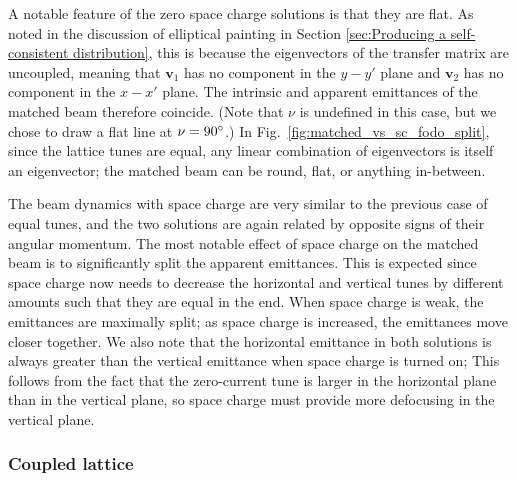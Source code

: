%
A notable feature of the zero space charge solutions is that they are flat. As noted in the discussion of elliptical painting in Section \ref{sec:Producing a self-consistent distribution}, this is because the eigenvectors of the transfer matrix are uncoupled, meaning that $\mathbf{v}_1$ has no component in the $y-y'$ plane and $\mathbf{v}_2$ has no component in the $x-x'$ plane. The intrinsic and apparent emittances of the matched beam therefore coincide. (Note that $\nu$ is undefined in this case, but we chose to draw a flat line at $\nu = 90\degree$.) In Fig.~\ref{fig:matched_vs_sc_fodo_split}, since the lattice tunes are equal, any linear combination of eigenvectors is itself an eigenvector; the matched beam can be round, flat, or anything in-between. 

The beam dynamics with space charge are very similar to the previous case of equal tunes, and the two solutions are again related by opposite signs of their angular momentum. The most notable effect of space charge on the matched beam is to significantly split the apparent emittances. This is expected since space charge now needs to decrease the horizontal and vertical tunes by different amounts such that they are equal in the end. When space charge is weak, the emittances are maximally split; as space charge is increased, the emittances move closer together. We also note that the horizontal emittance in both solutions is always greater than the vertical emittance when space charge is turned on; This follows from the fact that the zero-current tune is larger in the horizontal plane than in the vertical plane, so space charge must provide more defocusing in the vertical plane.






\subsubsection{Coupled lattice}

